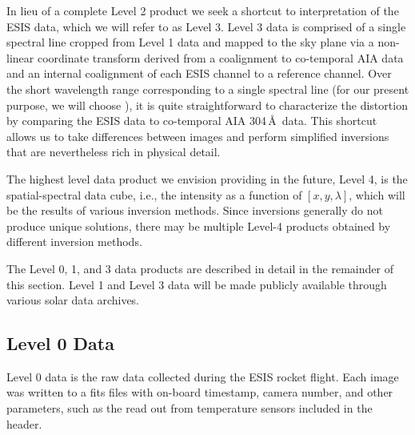 In lieu of a complete Level 2 product we seek a shortcut to interpretation of the ESIS data, which  we will refer to as Level 3.
Level 3 data is comprised of a single spectral line cropped from Level 1 data and mapped to the sky plane via a non-linear coordinate transform derived from a coalignment to co-temporal AIA data and an internal coalignment of each ESIS channel to a reference channel. Over the short wavelength range corresponding to a single spectral line (for our present purpose, we will choose \ov), it is quite straightforward to characterize the distortion by comparing the ESIS data to co-temporal AIA 304\,\AA\ data. This shortcut allows us to take differences between images and perform simplified inversions that are nevertheless rich in physical detail.

   

    
The highest level data product we envision providing in the future, Level 4, is the spatial-spectral data cube, i.e., the intensity as a function of $[x, y , \lambda]$, which will be the results of various inversion methods.    
Since inversions generally do not produce unique solutions, there may be multiple Level-4 products obtained by different inversion methods.

The Level 0, 1, and 3 data products are described in detail in the remainder of this section. Level 1 and Level 3 data will be made publicly available through various solar data archives.  
    
\subsection{Level 0 Data}
    
Level 0 data is the raw data collected during the ESIS rocket flight.  
Each image was written to a fits files with on-board timestamp, camera number, and other parameters, such as the read out from temperature sensors included in the header.   

